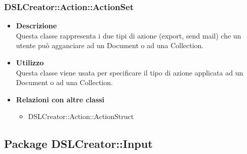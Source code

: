  \subsubsection{DSLCreator::Action::ActionSet}
                    \begin{itemize}
                        \item \textbf{Descrizione} \hfill \\
                          Questa classe rappresenta i due tipi di azione (export, send mail) che un utente può agganciare ad un Document o ad una Collection.
                        \item \textbf{Utilizzo} \hfill \\
                          Questa classe viene usata per specificare il tipo di azione applicata ad un Document o ad una Collection.
                        \item \textbf{Relazioni con altre classi}
                            \begin{itemize}
                              \item DSLCreator::Action::ActionStruct
                            \end{itemize}
                    \end{itemize}  

\subsection{Package DSLCreator::Input}
